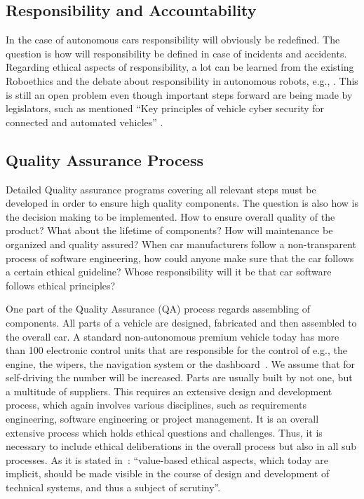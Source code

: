 \subsection{Responsibility and Accountability}
\label{sec:EAofTC:ResponsibilityAndAccountability}

In the case of autonomous cars responsibility will obviously be redefined. The question is how will responsibility be defined in case of incidents and accidents. Regarding ethical aspects of responsibility, a lot can be learned from the existing Roboethics and the debate about responsibility in autonomous robots, e.g., \cite{Dodig-Crnkovic:2008:SMR:1566864.1566888}. This is still an open problem even though important steps forward are being made by legislators, such as mentioned \enquote{Key principles of vehicle cyber security for connected and automated vehicles} \cite{DepartmentforTransportDfT2017}.


\subsection{Quality Assurance Process}
\label{sec:EAofTC:QualityAssuranceProcess}

Detailed Quality assurance programs covering all relevant steps must be developed in order to ensure high quality components. The question is also how is the decision making to be implemented. How to ensure overall quality of the product? What about the lifetime of components? How will maintenance be organized and quality assured?
When car manufacturers follow a non-transparent process of software engineering, how could anyone make sure that the car follows a certain ethical guideline? Whose responsibility will it be that car software follows ethical principles?

One part of the Quality Assurance (QA) process regards assembling of components. All parts of a vehicle are designed, fabricated and then assembled to the overall car. A standard non-autonomous premium vehicle today has more than 100 electronic control units that are responsible for the control of e.g., the engine, the wipers, the navigation system or the dashboard~\cite{PELLICCIONE201783}. We assume that for self-driving the number will be increased. Parts are usually built by not one, but a multitude of suppliers. This requires an extensive design and development process, which again involves various disciplines, such as requirements engineering, software engineering or project management. It is an overall extensive process which holds ethical questions and challenges. Thus, it is necessary to include ethical deliberations in the overall process but also in all sub processes. As it is stated in~\cite{Sapienza2016a}: \enquote{value-based ethical aspects, which today are implicit, should be made visible in the course of design and development of technical systems, and thus a subject of scrutiny}. 


